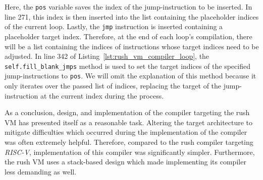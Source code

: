 
Here, the \texttt{pos} variable saves the index of the jump-instruction to be inserted.
In line 271, this index is then inserted into the list containing the placeholder indices of the current loop.
Lastly, the \texttt{jmp} instruction is inserted containing a placeholder target index.
Therefore, at the end of each loop's compilation, there will be a list containing the indices of instructions whose target indices need to be adjusted.
In line 342 of Listing~\ref{lst:rush_vm_compiler_loop}, the \texttt{self.fill\_blank\_jmps} method is used to set the target indices of the specified jump-instructions to \texttt{pos}.
We will omit the explanation of this method because it only iterates over the passed list of indices, replacing the target of the jump-instruction at the current index during the process.

As a conclusion, design, and implementation of the compiler targeting the rush VM has presented itself as a reasonable task.
Altering the target architecture to mitigate difficulties which occurred during the implementation of the compiler was often extremely helpful.
Therefore, compared to the rush compiler targeting \emph{RISC-V},
implementation of this compiler was significantly simpler.
Furthermore, the rush VM uses a stack-based design which made implementing its compiler less demanding as well.

